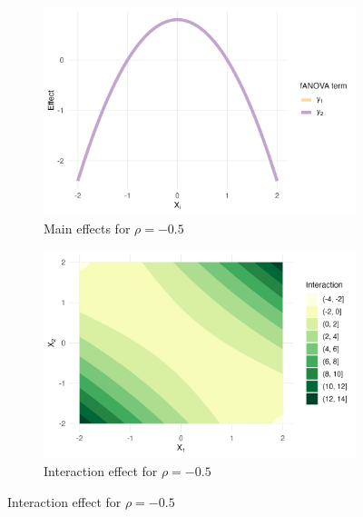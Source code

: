 \begin{figure}[htpb]
    \centering
    \begin{subfigure}[t]{0.49\textwidth}
        \centering
        \includegraphics[width=\textwidth]{images/experiment_section/interaction_a1p00_a2p00_a11p00_a22p00_a12p20_rhom05_main.png}
        \caption{Main effects for $\rho = -0.5$}
    \end{subfigure}%
    \hfill
    \begin{subfigure}[t]{0.49\textwidth}
        \centering
        \includegraphics[width=\textwidth]{images/experiment_section/interaction_a1p00_a2p00_a11p00_a22p00_a12p20_rhom05_interaction.png}
        \caption{Interaction effect for $\rho = -0.5$}
    \end{subfigure}


\end{figure}
